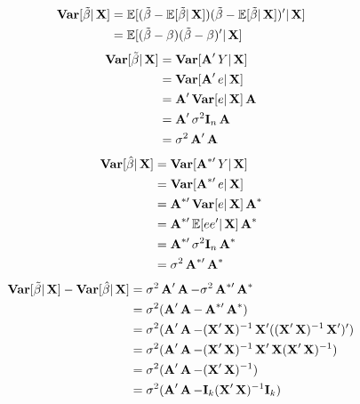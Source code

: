 \documentclass[UTF8,a4paper,10pt]{article}
\begin{document}
\begin{solution}
    \begin{equation*}
      \begin{aligned}
        \Var[\tilde{\beta}|\X]&=\E[(\tilde{\beta}-\E[\tilde{\beta}|\X])(\tilde{\beta}-\E[\tilde{\beta}|\X])'|\X]\\
        &=\E[(\tilde{\beta}-\beta)(\tilde{\beta}-\beta)'|\X]\\
      \end{aligned}
    \end{equation*}
    \begin{equation*}
      \begin{aligned}
        \Var[\tilde{\beta}|\X]&=\Var[\A^{\prime}Y|\X]\\
        &=\Var[\A^{\prime}e|\X]\\
        &=\A^{\prime}\Var[e|\X]\A\\
        &=\A^{\prime}\sigma^2\mathbf{I}_n\A\\
        &=\sigma^2\A^{\prime}\A
      \end{aligned}
    \end{equation*}
    \begin{equation*}
      \begin{aligned}
        \Var[\hat{\beta}|\X]&=\Var[\A^{*\prime}Y|\X]\\
        &=\Var[\A^{*\prime}e|\X]\\
        &=\A^{*\prime}\Var[e|\X]\A^*\\
        &=\A^{*\prime}\E[ee'|\X]\A^*\\
        &=\A^{*\prime}\sigma^2\mathbf{I}_n\A^*\\
        &=\sigma^2\A^{*\prime}\A^*
      \end{aligned}
    \end{equation*}
    \begin{equation*}
      \begin{aligned}
        \Var[\tilde{\beta}|\X]-\Var[\hat{\beta}|\X]&=\sigma^2\A^{\prime}\A-\sigma^2\A^{*\prime}\A^*\\
        &=\sigma^2(\A^{\prime}\A-\A^{*\prime}\A^*)\\
        &=\sigma^2(\A^{\prime}\A-(\X'\X)^{-1}\X'((\X'\X)^{-1}\X')')\\
        &=\sigma^2(\A^{\prime}\A-(\X'\X)^{-1}\X'\X(\X'\X)^{-1})\\
        &=\sigma^2(\A^{\prime}\A-(\X'\X)^{-1})\\
        &=\sigma^2(\A'\A-\mathbf{I}_k(\X'\X)^{-1}\mathbf{I}_k)\\

\end{aligned}
\end{equation*}
\end{solution}
\end{document}
